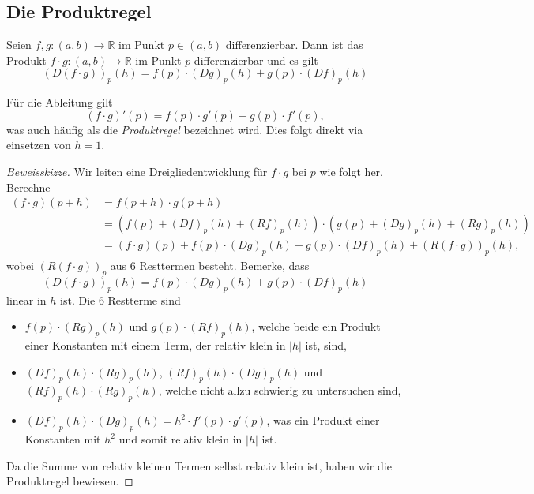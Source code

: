 \documentclass[../main.tex]{subfiles}
\begin{document}
\subsection*{Die Produktregel}
\begin{productrule}
Seien $f, g \colon (a, b) \to \mathbb{R}$ 
im Punkt $p \in (a, b)$ differenzierbar.
Dann ist das Produkt
$f \cdot g \colon (a, b) \to \mathbb{R}$ 
im Punkt $p$ differenzierbar und es gilt
\[
  {(D(f \cdot g))}_p(h) = f(p) \cdot
  {(Dg)}_p(h) + g(p) \cdot {(Df)}_p(h)
\]
\end{productrule}

\begin{remark}
  Für die Ableitung gilt
  \[
    {(f\cdot g)}'(p) = f(p) \cdot g'(p) + g(p) \cdot f'(p),
  \]
  was auch häufig als die \emph{Produktregel}
  bezeichnet wird.
  Dies folgt direkt via einsetzen von $h = 1$.
\end{remark}

\begin{proof}[Beweisskizze]
  Wir leiten eine Dreigliedentwicklung für $f \cdot g$ 
  bei $p$ wie folgt her. Berechne
  \begin{align*}
    (f \cdot g) (p+h)
    & = f(p+h) \cdot g(p+h)\\
    &= \left( f(p) + {(Df)}_p(h) + {(Rf)}_p(h) \right)
    \cdot \left( g(p) + {(Dg)}_p(h) + {(Rg)}_p(h) \right) \\
    &= (f \cdot g)(p)
    + f(p) \cdot {(Dg)}_p(h) + g(p) \cdot {(Df)}_p(h)
    + {(R(f \cdot g))}_p(h),
  \end{align*}
  wobei ${(R(f \cdot g))}_p$ aus $6$ Resttermen
  besteht.
  Bemerke, dass
  \[
    {(D(f \cdot g))}_p(h) = f(p) \cdot {(Dg)}_p(h)
    + g(p) \cdot {(Df)}_p(h)
  \]
  linear in $h$ ist.
  Die $6$ Restterme sind
  \begin{itemize}
    \item $f(p) \cdot {(Rg)}_p(h)$ und
      $g(p) \cdot {(Rf)}_p(h)$, welche beide
      ein Produkt einer Konstanten
      mit einem Term, der relativ klein in $|h|$ ist, sind, %
    \item ${(Df)}_p(h) \cdot {(Rg)}_p(h)$,
      ${(Rf)}_p(h) \cdot {(Dg)}_p(h)$ und
      ${(Rf)}_p(h) \cdot {(Rg)}_p(h)$,
      welche nicht allzu schwierig zu untersuchen sind,
    \item ${(Df)}_p(h) \cdot {(Dg)}_p(h) = h^2
      \cdot f'(p) \cdot g'(p)$, was ein Produkt
      einer Konstanten
      mit $h^2$ und somit relativ klein in $|h|$ ist.
  \end{itemize}
  Da die Summe von relativ kleinen Termen selbst relativ
  klein ist, haben wir die Produktregel bewiesen.
\end{proof}
\end{document}
